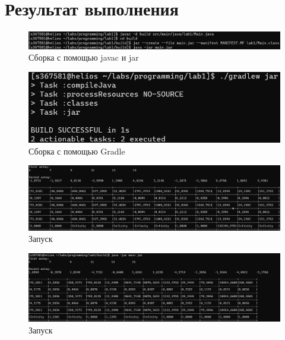 \section{Результат выполнения}
\begin{figure}[ht]
    \centering
    \includegraphics[scale=0.5]{img/build_cli.png}
    \caption{Сборка с помощью javac и jar}
\end{figure}
\begin{figure}[htb!]
    \centering
    \includegraphics{img/build_gradle.png}
    \caption{Сборка с помощью Gradle}
\end{figure}
\begin{figure}[ht]
    \centering
    \includegraphics[scale=0.4]{img/first.png}
    \caption{Запуск }
\end{figure}
\begin{figure}[htb!]
    \centering
    \includegraphics[scale=0.4]{img/second.png}
    \caption{Запуск }
\end{figure}